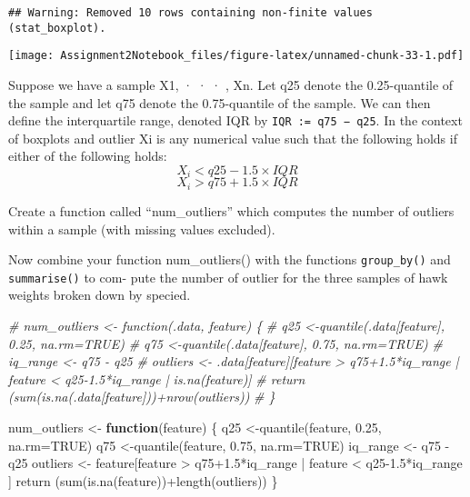 \documentclass[
]{article}
\newenvironment{Shaded}{\begin{snugshade}}{\end{snugshade}}
\newcommand{\AttributeTok}[1]{\textcolor[rgb]{0.77,0.63,0.00}{#1}}
\newcommand{\CommentTok}[1]{\textcolor[rgb]{0.56,0.35,0.01}{\textit{#1}}}
\newcommand{\ConstantTok}[1]{\textcolor[rgb]{0.00,0.00,0.00}{#1}}
\newcommand{\ControlFlowTok}[1]{\textcolor[rgb]{0.13,0.29,0.53}{\textbf{#1}}}
\newcommand{\FloatTok}[1]{\textcolor[rgb]{0.00,0.00,0.81}{#1}}
\newcommand{\FunctionTok}[1]{\textcolor[rgb]{0.00,0.00,0.00}{#1}}
\newcommand{\NormalTok}[1]{#1}
\newcommand{\OtherTok}[1]{\textcolor[rgb]{0.56,0.35,0.01}{#1}}
\newcommand{\SpecialCharTok}[1]{\textcolor[rgb]{0.00,0.00,0.00}{#1}}
\begin{document}
\begin{verbatim}
## Warning: Removed 10 rows containing non-finite values (stat_boxplot).
\end{verbatim}

\texttt{[image: Assignment2Notebook\_files/figure-latex/unnamed-chunk-33-1.pdf]}

Suppose we have a sample X1, · · · , Xn. Let q25 denote the
0.25-quantile of the sample and let q75 denote the 0.75-quantile of the
sample. We can then define the interquartile range, denoted IQR by
\texttt{IQR\ :=\ q75\ −\ q25}. In the context of boxplots and outlier Xi
is any numerical value such that the following holds if either of the
following holds:\\
\[X_i < q25 - 1.5 \times IQR\] \[X_i > q75 + 1.5 \times IQR\]

Create a function called ``num\_outliers'' which computes the number of
outliers within a sample (with missing values excluded).

Now combine your function num\_outliers() with the functions
\texttt{group\_by()} and \texttt{summarise()} to com- pute the number of
outlier for the three samples of hawk weights broken down by specied.

\begin{Shaded}
\begin{Highlighting}[]
\CommentTok{\# num\_outliers \textless{}{-} function(.data, feature) \{}
\CommentTok{\#   q25 \textless{}{-}quantile(.data[feature], 0.25, na.rm=TRUE)}
\CommentTok{\#   q75 \textless{}{-}quantile(.data[feature], 0.75, na.rm=TRUE)}
\CommentTok{\#   iq\_range \textless{}{-} q75 {-} q25}
\CommentTok{\#   outliers \textless{}{-} .data[feature][feature \textgreater{} q75+1.5*iq\_range | feature \textless{} q25{-}1.5*iq\_range | is.na(feature)]}
\CommentTok{\#   return (sum(is.na(.data[feature]))+nrow(outliers))}
\CommentTok{\# \}}


\NormalTok{num\_outliers }\OtherTok{\textless{}{-}} \ControlFlowTok{function}\NormalTok{(feature) \{}
\NormalTok{  q25 }\OtherTok{\textless{}{-}}\FunctionTok{quantile}\NormalTok{(feature, }\FloatTok{0.25}\NormalTok{, }\AttributeTok{na.rm=}\ConstantTok{TRUE}\NormalTok{)}
\NormalTok{  q75 }\OtherTok{\textless{}{-}}\FunctionTok{quantile}\NormalTok{(feature, }\FloatTok{0.75}\NormalTok{, }\AttributeTok{na.rm=}\ConstantTok{TRUE}\NormalTok{)}
\NormalTok{  iq\_range }\OtherTok{\textless{}{-}}\NormalTok{ q75 }\SpecialCharTok{{-}}\NormalTok{ q25}
\NormalTok{  outliers }\OtherTok{\textless{}{-}}\NormalTok{ feature[feature }\SpecialCharTok{\textgreater{}}\NormalTok{ q75}\FloatTok{+1.5}\SpecialCharTok{*}\NormalTok{iq\_range }\SpecialCharTok{|}\NormalTok{ feature }\SpecialCharTok{\textless{}}\NormalTok{ q25}\FloatTok{{-}1.5}\SpecialCharTok{*}\NormalTok{iq\_range ]}
  \FunctionTok{return}\NormalTok{ (}\FunctionTok{sum}\NormalTok{(}\FunctionTok{is.na}\NormalTok{(feature))}\SpecialCharTok{+}\FunctionTok{length}\NormalTok{(outliers))}
\NormalTok{\}}
\end{Highlighting}
\end{Shaded}
\end{document}
